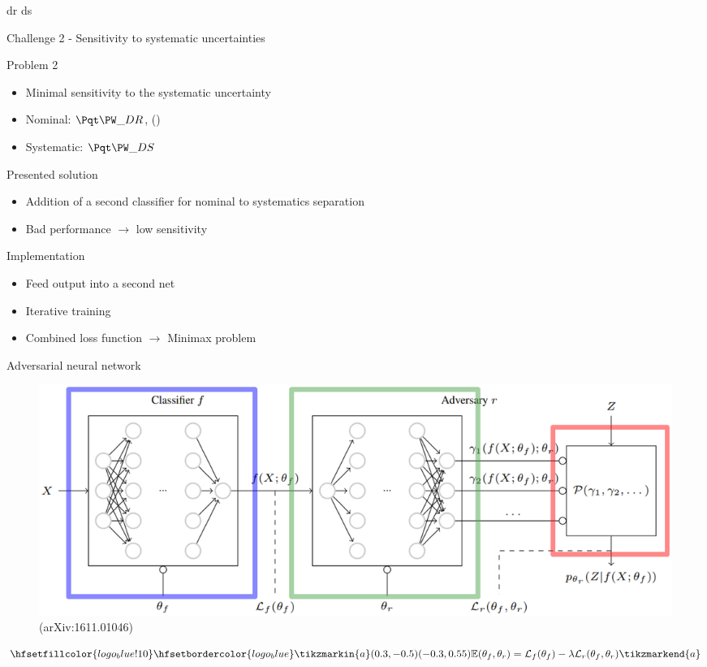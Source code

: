 \begin{frame}{dr ds}

\end{frame}


\begin{frame}{Challenge 2 - Sensitivity to systematic uncertainties}
\begin{block}{Problem 2}
    \begin{itemize}
        \item Minimal sensitivity to the systematic uncertainty
        \item Nominal: $\tW\_DR$, (\ttbar)
        \item Systematic: $\tW\_DS$
    \end{itemize}
\end{block}
\begin{block}{Presented solution}
   \begin{itemize}
       \item Addition of a second classifier for nominal to systematics separation
       \item Bad performance $\longrightarrow$ low sensitivity
   \end{itemize}
\end{block}
\begin{block}{Implementation}
    \begin{itemize}
        \item Feed output into a second net
        \item Iterative training
        \item Combined loss function $\longrightarrow$ Minimax problem
    \end{itemize}
\end{block}
\end{frame}

\begin{frame}{Adversarial neural network}
\vspace{-0.3cm}
    \begin{figure}
        \centering
        \includegraphics[width=\textwidth]{figures_theory/ANN_paper.eps}
        \caption{(arXiv:1611.01046)}
    \end{figure}
    \begin{equation*}
        \hfsetfillcolor{logo_blue!10}
        \hfsetbordercolor{logo_blue}
        \tikzmarkin{a}(0.3,-0.5)(-0.3,0.55)
        \mathbb{E}(\theta_f, \theta_r) = \mathcal{L}_f(\theta_f) - \lambda \mathcal{L}_r(\theta_f, \theta_r)
        \tikzmarkend{a}
    \end{equation*}
\end{frame}

